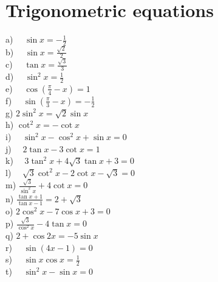 \documentclass[10pt]{article}
\begin{document}
\section{ Trigonometric equations}

a) $\quad \sin x=-\frac{1}{2}$\\

b) $\quad \sin x=\frac{\sqrt{2}}{2}$\\

c) $\quad \tan x=\frac{\sqrt{3}}{3}$\\

d) $\quad \sin ^2 x=\frac{1}{2}$\\

e) $\quad \cos \left(\frac{\pi}{4}-x\right)=1$\\

f) $\quad \sin \left(\frac{\pi}{3}-x\right)=-\frac{1}{2}$\\

g) $2 \sin ^2 x=\sqrt{2} \sin x$\\

h) $\cot ^2 x=-\cot x$\\

i) $\quad \sin ^2 x-\cos ^2 x+\sin x=0$\\

j) $\quad 2 \tan x-3 \cot x=1$\\

k) $\quad 3 \tan ^2 x+4 \sqrt{3} \tan x+3=0$\\

l) $\quad \sqrt{3} \cot ^2 x-2 \cot x-\sqrt{3}=0$\\

m) $\frac{\sqrt{3}}{\sin ^2 x}+4 \cot x=0$\\

n) $\frac{\tan x+1}{\tan x-1}=2+\sqrt{3}$\\

o) $2 \cos ^2 x-7 \cos x+3=0$\\

p) $\frac{\sqrt{3}}{\cos ^2 x}-4 \tan x=0$\\

q) $2+\cos 2 x=-5 \sin x$\\

r) $\quad \sin (4 x-1)=0$\\

s) $\quad \sin x \cos x=\frac{1}{2}$\\

t) $\quad \sin ^2 x-\sin x=0$\\
\end{document}
